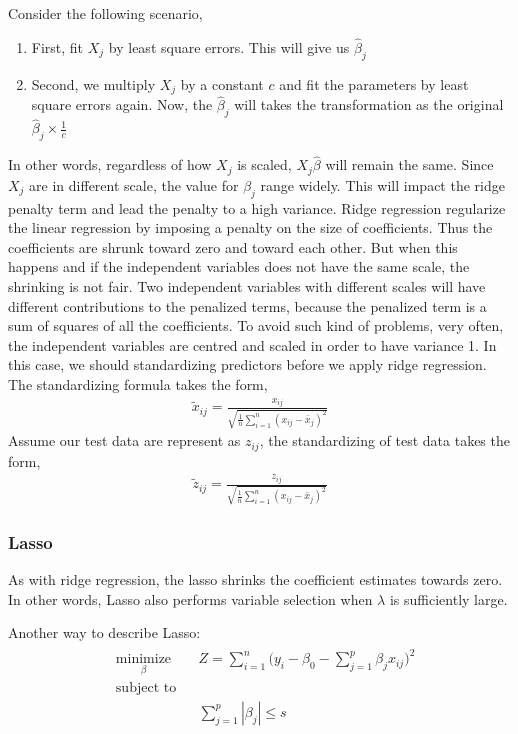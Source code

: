 \documentclass[12pt,a4paper]{article}%
\theoremstyle{definition}
\theoremstyle{plain}
\numberwithin{equation}{section}
\newcounter{subsubsubsection}[subsubsection]
\begin{document}
\subsubsubsection{\textcolor{blue}{Scale equivariant}}
Consider the following scenario,
\begin{enumerate}
\item First, fit $X_{j}$ by least square errors. This will give us $\hat{\beta}_{j}$
\item Second, we multiply $X_{j}$ by a constant $c$ and fit the parameters by least square errors again. Now, the $\hat{\beta}_{j}$ will takes the transformation as the original $\hat{\beta}_{j} \times \frac{1}{c}$
\end{enumerate}

In other words, regardless of how $X_{j}$ is scaled, $X_{j}\hat{\beta}$ will remain the same. Since $X_{j}$ are in different scale, the value for $\beta_{j}$ range widely. 
This will impact the ridge penalty term and lead the penalty to a high variance. Ridge regression regularize the linear regression by imposing a penalty on the size of coefficients. Thus the coefficients are shrunk toward zero and toward each other. But when this happens and if the independent variables does not have the same scale, the shrinking is not fair. Two independent variables with different scales will have different contributions to the penalized terms, because the penalized term is a sum of squares of all the coefficients. To avoid such kind of problems, very often, the independent variables are centred and scaled in order to have variance 1. In this case, we should standardizing predictors before we apply ridge regression. The standardizing formula takes the form,
\begin{gather*}
\tilde{x}_{ij} = \frac{x_{ij}}{\sqrt{\frac{1}{n}\sum\limits^{n}_{i=1} (x_{ij}-\bar{x}_{j})^{2}}}
\end{gather*}
Assume our test data are represent as $z_{ij}$, the standardizing of test data takes the form,
\begin{gather*}
\tilde{z}_{ij} = \frac{z_{ij}}{\sqrt{\frac{1}{n}\sum\limits^{n}_{i=1} (x_{ij}-\bar{x}_{j})^{2}}}
\end{gather*}

\subsubsection{\textbf{Lasso}}
As with ridge regression, the lasso shrinks the coefficient estimates towards zero. In other words, Lasso also performs variable selection when $\lambda$ is sufficiently large. 

Another way to describe Lasso:
\begin{equation}
\begin{aligned}
\begin{split}
& \underset{\beta}{\text{minimize}} & & Z = \sum\limits_{i=1}^{n} \bigg( y_{i}-\beta_{0}- \sum\limits_{j=1}^{p}\beta_{j}x_{ij} \bigg)^{2} \\
& \text{subject to} 				& & \\
& & & \sum\limits_{j=1}^{p}|\beta_{j}| \leq s
\end{split}
\end{aligned}
\label{lasso}
\end{equation}
\end{document}
